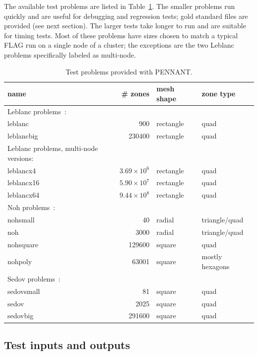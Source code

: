 \documentclass[11pt,letterpaper]{article}
\begin{document}
The available test problems are listed in Table~\ref{tbl:tests}.
The smaller problems run quickly and are useful for debugging and
regression tests; gold standard files are provided (see next section).
The larger tests take longer to run and are suitable for timing tests.
Most of these problems have sizes chosen to match a typical FLAG run
on a single node of a cluster; the exceptions are the two Leblanc
problems specifically labeled as multi-node.

\begin{table}
\centering
\caption{Test problems provided with PENNANT.}
\label{tbl:tests}
\begin{tabular}{lrll}
    \hline
    name & \# zones & mesh shape & zone type \\
    \hline
    Leblanc problems~\cite{leblanc}: \\
    leblanc    &    900 & rectangle & quad \\
    leblancbig & 230400 & rectangle & quad \\
    \hline
    Leblanc problems, multi-node versions: \\
    leblancx4  & $3.69 \times 10^6$ & rectangle & quad \\
    leblancx16 & $5.90 \times 10^7$ & rectangle & quad \\
    leblancx64 & $9.44 \times 10^8$ & rectangle & quad \\
    \hline
    Noh problems~\cite{noh}: \\
    nohsmall   &     40 & radial    & triangle/quad \\
    noh        &   3000 & radial    & triangle/quad \\
    nohsquare  & 129600 & square    & quad \\
    nohpoly    &  63001 & square    & mostly hexagons \\
    \hline
    Sedov problems~\cite{sedov}: \\
    sedovsmall &     81 & square    & quad \\
    sedov      &   2025 & square    & quad \\
    sedovbig   & 291600 & square    & quad \\
    \hline
\end{tabular}
\end{table}

\subsection{Test inputs and outputs}
\end{document}
